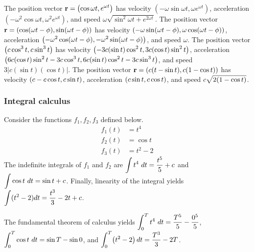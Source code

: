\begin{answer}[Acceleration]
	The position vector $\displaystyle \mathbf{r} = \left(\cos \omega t, e^{\omega t}\right)$ has velocity $\left(-\omega \sin \omega t, \omega e^{\omega t}\right)$, acceleration $\left(-\omega^2 \cos \omega t, \omega^2 e^{\omega t}\right)$, and speed $\omega \sqrt{\sin^2 \omega t + e^{2 \omega t}}$.
	The position vector $\displaystyle \mathbf{r} = \left(\cos(\omega t - \phi), \sin(\omega t - \phi)\right)$ has velocity $\displaystyle \left(-\omega \sin(\omega t - \phi), \omega \cos(\omega t - \phi)\right)$, acceleration $\displaystyle \left(-\omega^2 \cos(\omega t-\phi), -\omega^2\sin(\omega t-\phi)\right)$, and speed $\omega$.
	The position vector $\displaystyle \left(c \cos^3 t, c \sin^3 t\right)$ has velocity $\displaystyle \left(-3c (\sin t)\cos^2 t, 3c(\cos t)\sin^2 t\right)$, acceleration $\displaystyle \left(6c (\cos t)\sin^2 t - 3c\cos^3 t, 6c (\sin t)\cos^2 t - 3c\sin^3 t\right)$, and speed $3\left| c (\sin t)(\cos t) \right|$.
	The position vector $\displaystyle \mathbf{r} = \left(c(t-\sin t), c(1-\cos t)\right)$ has velocity $\displaystyle \left(c - c\cos t, c\sin t\right)$, acceleration $\displaystyle \left(c\sin t,  c\cos t\right)$, and speed $\displaystyle c\sqrt{2(1- \cos t)}$.
\end{answer}

\subsubsection{Integral calculus}
\setcounter{answer}{0}

\begin{answer}
	Consider the functions $f_1, f_2, f_3$ defined below.
	\begin{align}
		f_1(t) & = t^4     \\
		f_2(t) & = \cos t  \\
		f_3(t) & = t^2 - 2
	\end{align}
	The indefinite integrals of $f_1$ and $f_2$ are $\displaystyle \int t^4 ~dt = \frac{t^5}{5} + c$ and $\displaystyle \int \cos t ~dt = \sin t + c$.
	Finally, linearity of the integral yields $\displaystyle \int (t^2 - 2) dt = \frac{t^3}{3} - 2t + c$.
\end{answer}

\begin{answer}
	The fundamental theorem of calculus yields $\displaystyle \int_0^T t^4 ~dt = \frac{T^5}{5} - \frac{0^5}{5}$, $\displaystyle \int_0^T \cos t ~dt= \sin T - \sin 0$, and $\displaystyle \int_0^T \!\left(t^2-2\right) dt = \frac{T^3}{3} - 2T$.
\end{answer}

